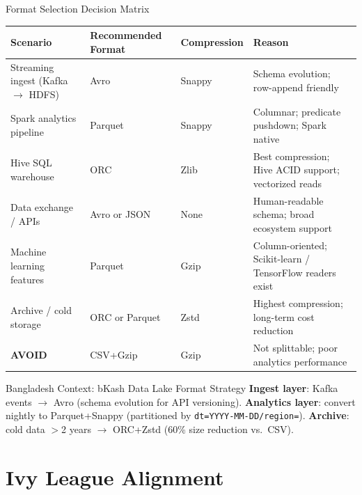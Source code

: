 \documentclass[aspectratio=169,10pt]{beamer}
\begin{document}
\begin{frame}{Format Selection Decision Matrix}
  \begin{center}
  \renewcommand{\arraystretch}{1.5}
  \begin{tabular}{p{3.5cm}p{2.4cm}p{2.5cm}p{2.8cm}}
    \toprule
    \textbf{Scenario} & \textbf{Recommended Format} & \textbf{Compression} & \textbf{Reason} \\
    \midrule
    Streaming ingest (Kafka $\to$ HDFS)
      & Avro & Snappy & Schema evolution; row-append friendly \\
    Spark analytics pipeline
      & Parquet & Snappy & Columnar; predicate pushdown; Spark native \\
    Hive SQL warehouse
      & ORC & Zlib & Best compression; Hive ACID support; vectorized reads \\
    Data exchange / APIs
      & Avro or JSON & None & Human-readable schema; broad ecosystem support \\
    Machine learning features
      & Parquet & Gzip & Column-oriented; Scikit-learn / TensorFlow readers exist \\
    Archive / cold storage
      & ORC or Parquet & Zstd & Highest compression; long-term cost reduction \\
    \midrule
    \textbf{AVOID}
      & CSV+Gzip & Gzip & Not splittable; poor analytics performance \\
    \bottomrule
  \end{tabular}
  \end{center}
  \vspace{4pt}
  \begin{block}{Bangladesh Context: bKash Data Lake Format Strategy}
    \small \textbf{Ingest layer}: Kafka events $\to$ Avro (schema evolution for API versioning).
    \textbf{Analytics layer}: convert nightly to Parquet+Snappy (partitioned by \texttt{dt=YYYY-MM-DD/region=}).
    \textbf{Archive}: cold data $>$2 years $\to$ ORC+Zstd (60\% size reduction vs.\ CSV).
  \end{block}
\end{frame}

\section{Ivy League Alignment}
\end{document}

